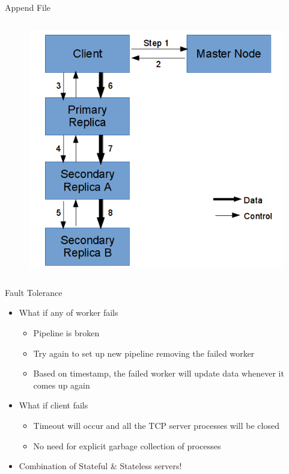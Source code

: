 \documentclass{beamer}
\makeatletter
\newcounter{multipleslide}
\newcommand{\restoreframe}
{
	\patchcmd{\beamer@@tmpl@footline}
	{\themultipleslide}
  	{\insertframenumber}
	{}
	{}
	\setcounter{framenumber}{\value{multipleslide}}
}
\makeatother
\begin{document}
\begin{frame}[allowframebreaks]{Append File}
\begin{columns}
\begin{column}{0.6\textwidth}
\begin{figure}[h]
            \includegraphics[scale=0.4]{images/append_pipeline}
        \end{figure}
    \end{column}
\end{columns}
\end{frame}
\restoreframe

\begin{frame}{Fault Tolerance}
\begin{itemize}
\item What if any of worker fails
\begin{itemize}
\item Pipeline is broken
\item Try again to set up new pipeline removing the failed worker
\item Based on timestamp, the failed worker will update data whenever it comes up again
\end{itemize}
\item What if client fails
\begin{itemize}
\item Timeout will occur and all the TCP server processes will be closed
\item No need for explicit garbage collection of processes
\end{itemize}
\item Combination of Stateful \& Stateless servers!
\end{itemize}
\end{frame}
\end{document}
